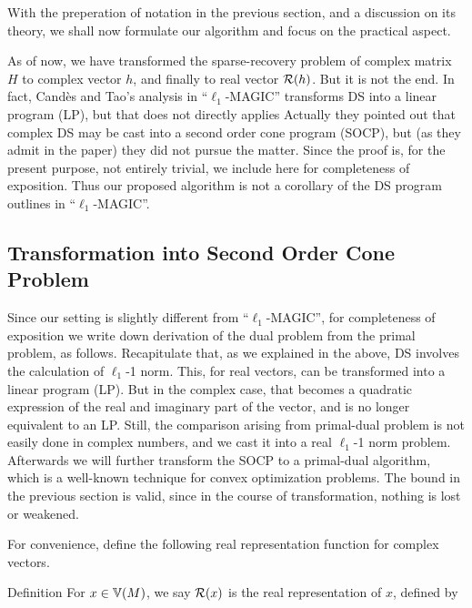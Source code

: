 
With the preperation of notation in the previous section, and a discussion on its theory, we shall now formulate our algorithm and focus on the practical aspect.

As of now, we have transformed the sparse-recovery problem of complex matrix \(H\) to complex vector \(h\), and finally to real vector \(\mathcal{R}(h)\).
But it is not the end.
In fact, Cand\`es and Tao's analysis in ``\(\ell_1\)-MAGIC'' transforms DS into a linear program (LP), but that does not directly applies
Actually they pointed out that complex DS may be cast into a second order cone program (SOCP), but (as they admit in the paper) they did not pursue the matter.
Since the proof is, for the present purpose, not entirely trivial, we include here for completeness of exposition.
Thus our proposed algorithm is not a corollary of the DS program outlines in ``\(\ell_1\)-MAGIC''.

\subsection{Transformation into Second Order Cone Problem}

Since our setting is slightly different from ``\(\ell_1\)-MAGIC'', for completeness of exposition we write down derivation of the dual problem from the primal problem, as follows.
Recapitulate that, as we explained in the above, DS involves the calculation of \(\ell_1\)-1 norm.
This, for real vectors, can be transformed into a linear program (LP).
But in the complex case, that becomes a quadratic expression of the real and imaginary part of the vector, and is no longer equivalent to an LP.
Still, the comparison arising from primal-dual problem is not easily done in complex numbers, and we cast it into a real \(\ell_1\)-1 norm problem.
Afterwards we will further transform the SOCP to a primal-dual algorithm, which is a well-known technique for convex optimization problems.
The bound in the previous section is valid, since in the course of transformation, nothing is lost or weakened.

For convenience, define the following real representation function for complex vectors.

\Result
{Definition}
{
For \(x \in \mathbb{V}(M)\), we say \(\mathcal{R}(x)\) is the real representation of \(x\), defined by
%
%
}

